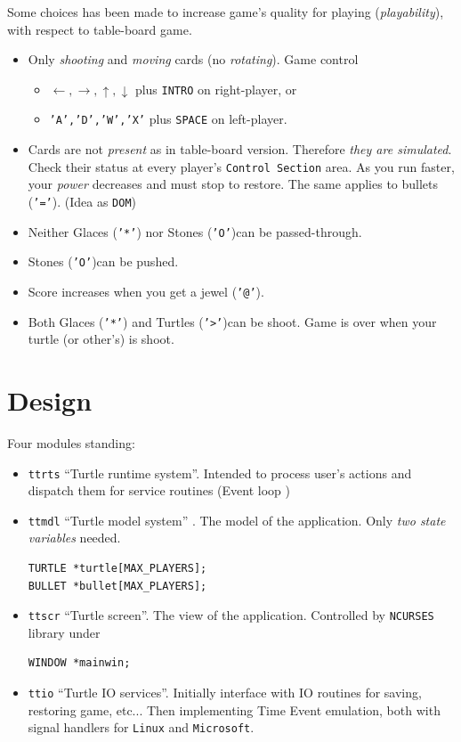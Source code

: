 \documentclass[a4paper,twoside,draft]{article}
\newcommand{\ncurses}{\texttt{NCURSES}\xspace}
\newcommand{\DOM}{\texttt{DOM}\xspace}
\begin{document}
Some choices has been made to increase game's quality for playing
(\emph{playability}), with respect to table-board game.
\begin{itemize}
\item Only \emph{shooting} and \emph{moving} cards (no
  \emph{rotating}). Game control 

  \begin{itemize}
  \item \(\leftarrow, \rightarrow, \uparrow, \downarrow\) plus
    \texttt{INTRO} on right-player, or
  \item  \texttt{'A','D','W','X'} plus \texttt{SPACE} on
    left-player.
  \end{itemize}

\item Cards are not \emph{present} as in table-board
  version. Therefore \emph{they are simulated}.  Check their status at
  every player's \texttt{Control Section} area.  As you run faster,
  your \emph{power} decreases and must stop to restore. The same
  applies to bullets (\texttt{'='}). (Idea as \DOM)
\item Neither Glaces (\texttt{'*'}) nor Stones (\texttt{'O'})can be passed-through. 
\item Stones (\texttt{'O'})can be pushed.
\item Score increases when you get a jewel (\texttt{'@'}).
\item Both Glaces (\texttt{'*'}) and Turtles (\texttt{'>'})can be
  shoot. Game is over when your turtle (or other's) is shoot.
\end{itemize}

\section{Design}
\label{sec:desgn}

Four modules standing:

\begin{itemize}
\item \texttt{ttrts} ``Turtle runtime system''. Intended to process
  user's actions and dispatch them for service  routines (Event loop )
\item \texttt{ttmdl} ``Turtle model system'' .  The model of the
  application. Only \emph{two state variables} needed.

\begin{verbatim}
TURTLE *turtle[MAX_PLAYERS];
BULLET *bullet[MAX_PLAYERS];
\end{verbatim}
\item \texttt{ttscr}  ``Turtle screen''. The view of the
  application. Controlled by \ncurses library under
\begin{verbatim}
WINDOW *mainwin;
\end{verbatim}
  
\item \texttt{ttio} ``Turtle IO services''. Initially interface with
  IO routines for saving, restoring game, etc... Then implementing
  Time Event emulation, both with signal handlers for \texttt{Linux}
  and \texttt{Microsoft}.
\end{itemize}
\end{document}

